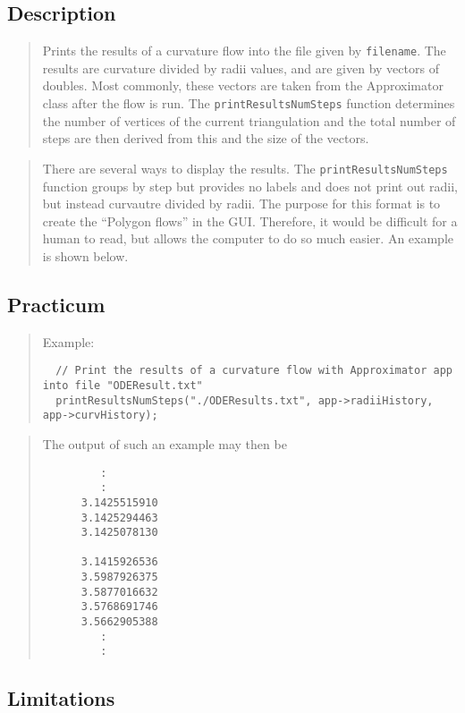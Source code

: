 \documentclass[10pt]{article}%
\begin{document}
\subsection*{Description}

\begin{quotation} Prints the results of a curvature flow into the file given by \texttt{filename}. The results are curvature divided by radii values, and are given by vectors of doubles. Most commonly, these vectors are taken from the Approximator class after the flow is run. The \texttt{printResultsNumSteps} function determines the number of vertices of the current triangulation and the total number of steps are then derived from this and the size of the vectors.\end{quotation}
\begin{quotation} There are several ways to display the results. The \texttt{printResultsNumSteps} function groups by step but provides no labels and does not print out radii, but instead curvautre divided by radii. The purpose for this format is to create the ``Polygon flows'' in the GUI. Therefore, it would be difficult for a human to read, but allows the computer to do so much easier. An example is shown below.\end{quotation}

\subsection*{Practicum}

\begin{quotation} Example:{\small{\begin{verbatim} 
  // Print the results of a curvature flow with Approximator app into file "ODEResult.txt"
  printResultsNumSteps("./ODEResults.txt", app->radiiHistory, app->curvHistory);
  \end{verbatim}
}}
\end{quotation}\begin{quotation} The output of such an example may then be{\small{\begin{verbatim} 
         :
         :
      3.1425515910
      3.1425294463
      3.1425078130

      3.1415926536
      3.5987926375
      3.5877016632
      3.5768691746
      3.5662905388
         :
         :
  \end{verbatim}
}}
\end{quotation}
\subsection*{Limitations}
\end{document}
